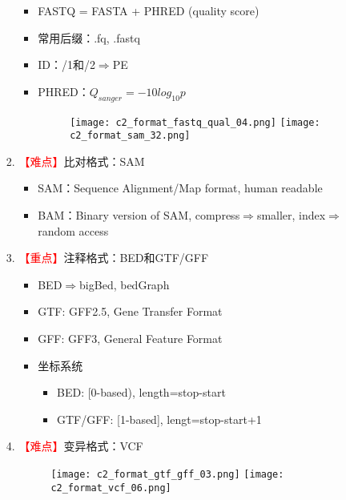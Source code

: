 \documentclass{TIJMUjiaoanLL}
\begin{document}
\begin{enumerate}
\begin{enumerate}
\begin{enumerate}
\begin{itemize}
              \item FASTQ = FASTA + PHRED (quality score)
              \item 常用后缀：.fq, .fastq
              \item ID：/1和/2$\Rightarrow$PE
              \item PHRED：$Q_{sanger} = -10log_{10}p$
            \vspace{-0.5em}
            \begin{figure}[h]
              \centering
              \texttt{[image: c2\_format\_fastq\_qual\_04.png]}
              \quad
              \texttt{[image: c2\_format\_sam\_32.png]}
            \end{figure}
            \vspace{-0.5em}
            \end{itemize}
          \item \textcolor{red}{【难点】}比对格式：SAM
            \begin{itemize}
              \item SAM：Sequence Alignment/Map format, human readable
              \item BAM：Binary version of SAM, compress$\Rightarrow$smaller, index$\Rightarrow$random access
            \end{itemize}
          \item \textcolor{red}{【重点】}注释格式：BED和GTF/GFF
            \begin{itemize}
              \item BED$\Rightarrow$bigBed, bedGraph
              \item GTF: GFF2.5, Gene Transfer Format
              \item GFF: GFF3, General Feature Format
              \item 坐标系统
                \begin{itemize}
                  \item BED: [0-based), length=stop-start
                  \item GTF/GFF: [1-based], lengt=stop-start+1
                \end{itemize}
            \end{itemize}

\otherTail
\newpage
\otherHeader

          \item \textcolor{red}{【难点】}变异格式：VCF
            \vspace{-0.5em}
            \begin{figure}[h]
              \centering
              \texttt{[image: c2\_format\_gtf\_gff\_03.png]}
              \quad
              \texttt{[image: c2\_format\_vcf\_06.png]}
            \end{figure}
            \vspace{-0.5em}
        \end{enumerate}
    \end{enumerate}


\end{enumerate}
\end{document}
